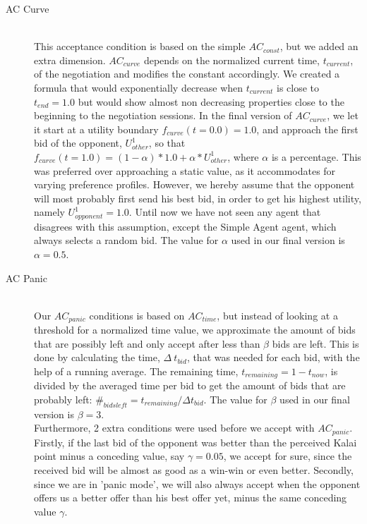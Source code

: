 \begin{description}
  \item[AC Curve] \hfill \\
This acceptance condition is based on the simple $AC_{const}$\cite{baarslag2013acceptance}, but we added an extra dimension. $AC_{curve}$ depends on the normalized current time, $t_{current}$, of the negotiation and modifies the constant accordingly. We created a formula that would exponentially decrease when $t_{current}$ is close to $t_{end} = 1.0$ but would show almost non decreasing properties close to the beginning to the negotiation sessions. In the final version of $AC_{curve}$, we let it start at a utility boundary $f_{curve}(t = 0.0) = 1.0$, and approach the first bid of the opponent, $U_{other}^{1}$, so that $f_{curve}(t = 1.0) = (1 - \alpha) * 1.0 + \alpha * U_{other}^{1}$, where $\alpha$ is a percentage. This was preferred over approaching a static value, as it accommodates for varying preference profiles. However, we hereby assume that the opponent will most probably first send his best bid, in order to get his highest utility, namely $U_{opponent}^{1} = 1.0$. Until now we have not seen any agent that disagrees with this assumption, except the Simple Agent agent, which always selects a random bid. The value for $\alpha$ used in our final version is $\alpha = 0.5$.

  \item[AC Panic] \hfill \\
Our $AC_{panic}$ conditions is based on $AC_{time}$\cite{baarslag2013acceptance}, but instead of looking at a threshold for a normalized time value, we approximate the amount of bids that are possibly left and only accept after less than $\beta$ bids are left. This is done by calculating the time, $\Delta~t_{bid}$, that was needed for each bid, with the help of a running average. The remaining time, $t_{remaining} = 1 - t_{now}$, is divided by the averaged time per bid to get the amount of bids that are probably left: $\#_{bids left} = t_{remaining} / \Delta t_{bid}$. The value for $\beta$ used in our final version is $\beta = 3$.\\

Furthermore, 2 extra conditions were used before we accept with $AC_{panic}$. Firstly, if the last bid of the opponent was better than the perceived Kalai point minus a conceding value, say $\gamma = 0.05$, we accept for sure, since the received bid will be almost as good as a win-win or even better. Secondly, since we are in 'panic mode', we will also always accept when the opponent offers us a better offer than his best offer yet, minus the same conceding value $\gamma$.


\end{description}
